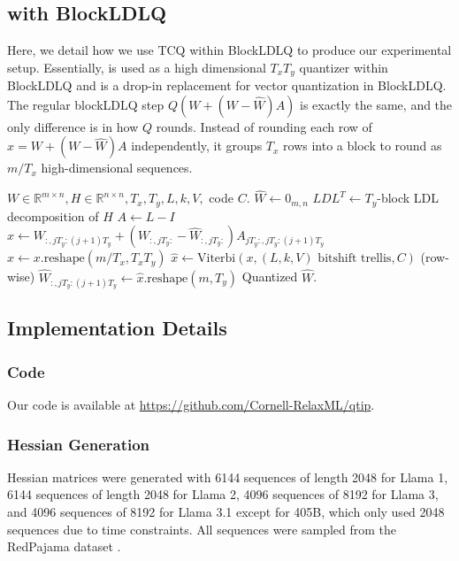 \subsection{\qts with BlockLDLQ}

Here, we detail how we use TCQ within BlockLDLQ to produce our experimental setup.
Essentially, \qts is used as a high dimensional $T_xT_y$ quantizer within BlockLDLQ and is a drop-in replacement for vector quantization in BlockLDLQ.
The regular blockLDLQ step $Q(W + (W - \hat W)A)$ is exactly the same, and the only difference is in how $Q$ rounds.
Instead of rounding each row of $x = W + (W - \hat W)A$ independently, it groups $T_x$ rows into a block to round as $m/T_x$ high-dimensional sequences.

\begin{algorithm}[h]
\caption{\qts with BlockLDLQ}
\begin{algorithmic}
\INPUT $W \in \mathbb{R}^{m \times n}, H \in \mathbb{R}^{n \times n}, T_x, T_y, L, k, V,$ code $C$. 
\STATE $\hat W \gets 0_{m, n}$
\STATE $LDL^T \gets T_y$-block LDL decomposition of $H$
\STATE $A \gets L - I$
\STATE $x \gets W_{:, jT_y:(j+1)T_y} + (W_{:, jT_y:} - \hat W_{:, jT_y:}) A_{jT_y:,jT_y:(j+1)T_y}$
\STATE $x \gets x\text{.reshape}(m/T_x, T_xT_y)$
\STATE $\hat x \gets \text{Viterbi}(x, (L, k, V) \text{ bitshift trellis}, C)$ (row-wise)
\STATE $\hat W_{:, jT_y:(j+1)T_y} \gets \hat x\text{.reshape}(m, T_y)$
\ENDFOR
\OUTPUT Quantized $\hat W$.
\end{algorithmic}
\label{alg:qtblockldlq}
\end{algorithm}



\subsection{Implementation Details}

\subsubsection{Code}

Our code is available at \url{https://github.com/Cornell-RelaxML/qtip}.

\subsubsection{Hessian Generation}

Hessian matrices were generated with 6144 sequences of length 2048 for Llama 1, 6144 sequences of length 2048 for Llama 2, 4096 sequences of 8192 for Llama 3, and 4096 sequences of 8192 for Llama 3.1 except for 405B, which only used 2048 sequences due to time constraints.
All sequences were sampled from the RedPajama dataset \cite{rpv1}.

